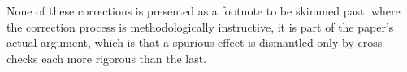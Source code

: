 \documentclass[aps,physrev,reprint,superscriptaddress,amsmath,amssymb,floatfix]{revtex4-2}
\begin{document}
None of these corrections is presented as a footnote to be skimmed past:
where the correction process is methodologically instructive, it is part of
the paper's actual argument, which is that a spurious effect is dismantled
only by cross-checks each more rigorous than the last.


\end{document}
